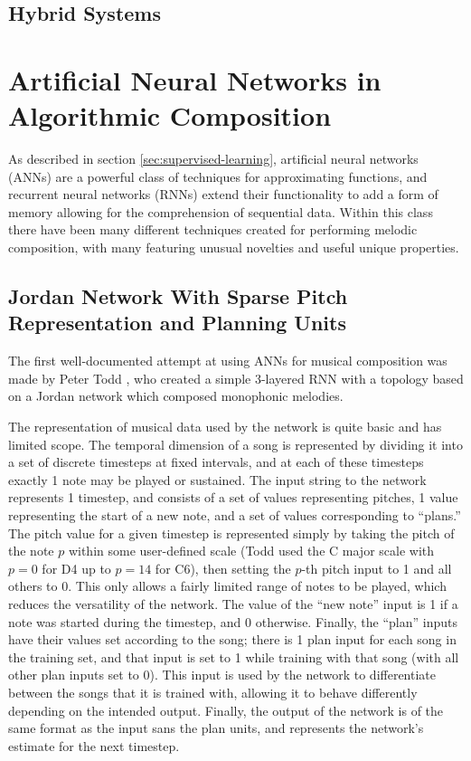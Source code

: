 \documentclass[ author={Stephen Livermore-Tozer},
				supervisor={Dr. Peter Flach},
				degree={MEng},
				title={Performing Algorithmic Co-composition Using Machine Learning},
				subtitle={},
				type={research},
				year={2016} ]{dissertation}
\begin{document}
	
	\subsection{Hybrid Systems}
	\label{sec:hybrid-systems}
	
	\section{Artificial Neural Networks in Algorithmic Composition}
	\label{sec:anns}
	
	As described in section \ref{sec:supervised-learning}, artificial neural networks (ANNs) are a powerful class of techniques for approximating functions, and recurrent neural networks (RNNs) extend their functionality to add a form of memory allowing for the comprehension of sequential data. Within this class there have been many different techniques created for performing melodic composition, with many featuring unusual novelties and useful unique properties.
	
	\subsection{Jordan Network With Sparse Pitch Representation and Planning Units}
	\label{sec:todd-net}
	
	The first well-documented attempt at using ANNs for musical composition was made by Peter Todd \cite{todd1989connectionist}, who created a simple 3-layered RNN with a topology based on a Jordan network \cite{jordan1997serial} which composed monophonic melodies.
	
	The representation of musical data used by the network is quite basic and has limited scope. The temporal dimension of a song is represented by dividing it into a set of discrete timesteps at fixed intervals, and at each of these timesteps exactly 1 note may be played or sustained. The input string to the network represents 1 timestep, and consists of a set of values representing pitches, 1 value representing the start of a new note, and a set of values corresponding to ``plans.'' The pitch value for a given timestep is represented simply by taking the pitch of the note $p$ within some user-defined scale (Todd used the C major scale with $p = 0$ for D4 up to $p = 14$ for C6), then setting the $p$-th pitch input to 1 and all others to 0. This only allows a fairly limited range of notes to be played, which reduces the versatility of the network. The value of the ``new note'' input is 1 if a note was started during the timestep, and 0 otherwise. Finally, the ``plan'' inputs have their values set according to the song; there is 1 plan input for each song in the training set, and that input is set to 1 while training with that song (with all other plan inputs set to 0). This input is used by the network to differentiate between the songs that it is trained with, allowing it to behave differently depending on the intended output. Finally, the output of the network is of the same format as the input sans the plan units, and represents the network's estimate for the next timestep.
	
\end{document}
